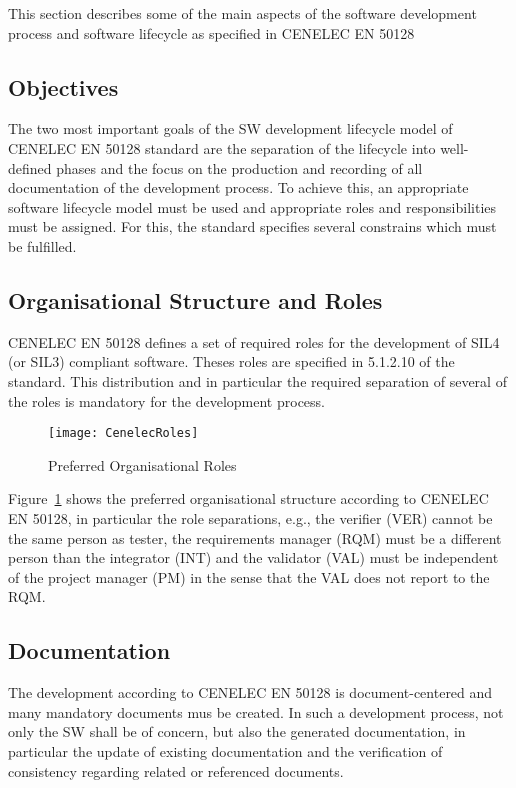 
This section describes some of the main aspects of the software development
process and software lifecycle as specified in CENELEC EN 50128

\subsection{Objectives}
\label{sec:objectives}

The two most important goals of the SW development lifecycle model of CENELEC EN
50128 standard are the separation of the lifecycle into well-defined phases and
the focus on the production and recording of all documentation of the
development process. To achieve this, an appropriate software lifecycle model
must be used and appropriate roles and responsibilities must be assigned. For
this, the standard specifies several constrains which must be fulfilled.

\subsection{Organisational Structure and Roles}
\label{sec:organ-struct-roles}

CENELEC EN 50128 defines a set of required roles for the development of SIL4 (or
SIL3) compliant software. Theses roles are specified in 5.1.2.10 of the
standard. This distribution and in particular the required separation of several
of the roles is mandatory for the development process.

\begin{figure}[ht]
  \centering
  \texttt{[image: CenelecRoles]}
  \caption{Preferred Organisational Roles~\cite{EN-50128}}
  \label{fig:preferred-roles}
\end{figure}

Figure~\ref{fig:preferred-roles} shows the preferred organisational structure
according to CENELEC EN 50128, in particular the role separations, e.g., the
verifier (VER) cannot be the same person as tester, the requirements manager
(RQM) must be a different person than the integrator (INT) and the validator
(VAL) must be independent of the project manager (PM) in the sense that the VAL
does not report to the RQM.

\subsection{Documentation}
\label{sec:documentation}

The development according to CENELEC EN 50128 is document-centered and many
mandatory documents mus be created.  In such a development process, not only the
SW shall be of concern, but also the generated documentation, in particular the
update of existing documentation and the verification of consistency regarding
related or referenced documents.

